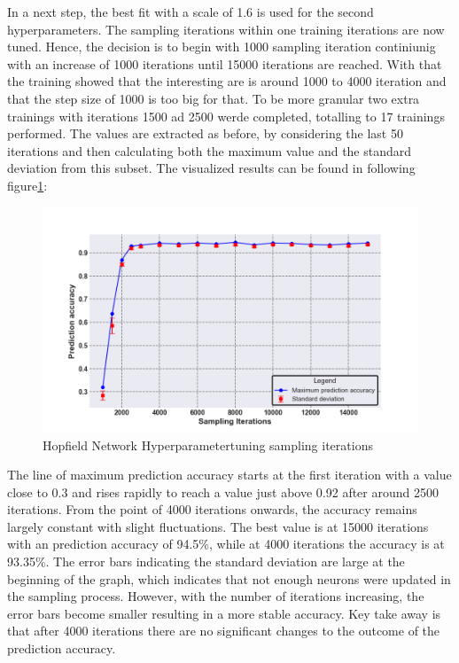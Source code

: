In a next step, the best fit with a scale of 1.6 is used for the second hyperparameters. 
The sampling iterations within one training iterations are now tuned.
Hence, the decision is to begin with 1000 sampling iteration continiunig with an increase of 1000 iterations until 15000 iterations are reached. 
With that the training showed that the interesting are is around 1000 to 4000 iteration and that the step size of 1000 is too big for that. 
To be more granular two extra trainings with iterations 1500 ad 2500 werde completed, totalling to 17 trainings performed.
The values are extracted as before, by considering the last 50 iterations and then calculating both the maximum value and the standard deviation from this subset.
The visualized results can be found in following figure\ref{Hyperparamers_Iteraions_ohne}:
\begin{figure}[H]
    \centering
    \includegraphics[width=0.9\linewidth]{graphics/Iterations_Ohne_N2_Half_Pred_Acc.png}
    \caption{Hopfield Network Hyperparametertuning sampling iterations}
    \label{Hyperparamers_Iteraions_ohne}
\end{figure}
The line of maximum prediction accuracy starts at the first iteration with a value close to 0.3 and rises rapidly to reach a value just above 0.92 after around 2500 iterations.
From the point of 4000 iterations onwards, the accuracy remains largely constant with slight fluctuations.
The best value is at 15000 iterations with an prediction accuracy of 94.5\%, while at 4000 iterations the accuracy is at 93.35\%.
The error bars indicating the standard deviation are large at the beginning of the graph, which indicates that not enough neurons were updated in the sampling process.
However, with the number of iterations increasing, the error bars become smaller resulting in a more stable accuracy.
Key take away is that after 4000 iterations there are no significant changes to the outcome of the prediction accuracy.

